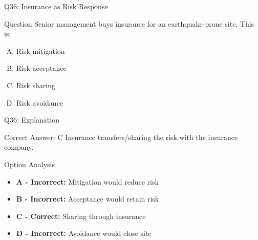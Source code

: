 \documentclass{beamer}
\begin{document}
	
	
	\begin{frame}{Q36: Insurance as Risk Response}
		\begin{block}{Question}
			Senior management buys insurance for an earthquake-prone site. This is:
		\end{block}
		\begin{enumerate}[(A)]
			\item Risk mitigation
			\item Risk acceptance
			\item Risk sharing
			\item Risk avoidance
		\end{enumerate}
	\end{frame}
	
	\begin{frame}{Q36: Explanation}
		\begin{block}{Correct Answer: C}
			Insurance transfers/sharing the risk with the insurance company.
		\end{block}
		\begin{block}{Option Analysis}
			\begin{itemize}
				\item \textbf{A - Incorrect:} Mitigation would reduce risk
				\item \textbf{B - Incorrect:} Acceptance would retain risk
				\item \textbf{C - Correct:} Sharing through insurance
				\item \textbf{D - Incorrect:} Avoidance would close site
			\end{itemize}
		\end{block}
	\end{frame}
	
\end{document}
